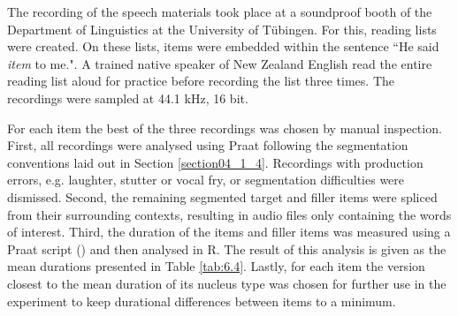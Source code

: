 The recording of the speech materials took place at a soundproof booth of the Department of Linguistics at the University of Tübingen. For this, reading lists were created. On these lists, items were embedded within the sentence ``He said \textit{item} to me.". A trained native speaker of New Zealand English read the entire reading list aloud for practice before recording the list three times. The recordings were sampled at 44.1 kHz, 16 bit.

For each item the best of the three recordings was chosen by manual inspection. First, all recordings were analysed using Praat following the segmentation conventions laid out in Section \ref{section04_1_4}. Recordings with production errors, e.g. laughter, stutter or vocal fry, or segmentation difficulties were dismissed. Second, the remaining segmented target and filler items were spliced from their surrounding contexts, resulting in audio files only containing the words of interest. Third, the duration of the items and filler items was measured using a Praat script (\cite{deJong2008}) and then analysed in R. The result of this analysis is given as the mean durations presented in Table \ref{tab:6.4}. Lastly, for each item the version closest to the mean duration of its nucleus type was chosen for further use in the experiment to keep durational differences between items to a minimum.

